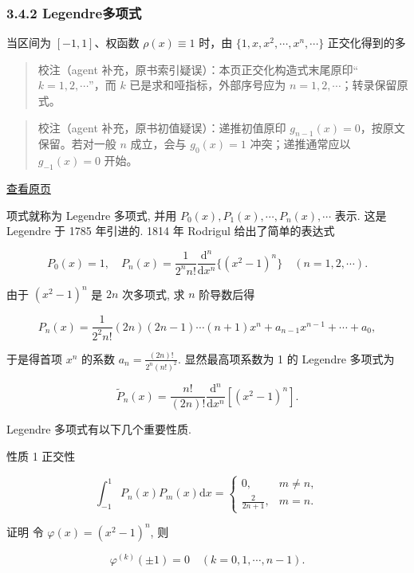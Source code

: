 \documentclass[
  10pt,
  fontset=fandol]{ctexart}
\begin{document}
\subsubsection{3.4.2 Legendre多项式}\label{legendreux591aux9879ux5f0f}

当区间为 \([-1, 1]\)、权函数 \(\rho(x) \equiv 1\) 时，由 \(\{1,\allowbreak  x,\allowbreak  x^2,\allowbreak  \cdots,\allowbreak  x^n,\allowbreak  \cdots\}\) 正交化得到的多

\begin{quote}
校注（agent 补充，原书索引疑误）：本页正交化构造式末尾原印``\(k=1,2,\cdots\)''，而 \(k\) 已是求和哑指标，外部序号应为 \(n=1,2,\cdots\)；转录保留原式。
\end{quote}

\begin{quote}
校注（agent 补充，原书初值疑误）：递推初值原印 \(g_{n-1}(x)=0\)，按原文保留。若对一般 \(n\) 成立，会与 \(g_0(x)=1\) 冲突；递推通常应以 \(g_{-1}(x)=0\) 开始。
\end{quote}

\href{../../source-images/pdf-071.jpeg}{查看原页}

项式就称为 Legendre 多项式, 并用 \(P_0(x), P_1(x), \cdots, P_n(x), \cdots\) 表示. 这是 Legendre 于 1785 年引进的. 1814 年 Rodrigul 给出了简单的表达式

\[
P_0(x) = 1, \quad P_n(x) = \frac{1}{2^n n!} \frac{\mathrm{d}^n}{\mathrm{d}x^n} \{(x^2 - 1)^n\} \quad (n = 1, 2, \cdots). \tag{3.4.1}
\]

由于 \((x^2 - 1)^n\) 是 \(2n\) 次多项式, 求 \(n\) 阶导数后得

\[
P_n(x) = \frac{1}{2^2 n!} (2n)(2n - 1) \cdots (n + 1)x^n + a_{n-1}x^{n-1} + \cdots + a_0,
\]

于是得首项 \(x^n\) 的系数 \(a_n = \frac{(2n)!}{2^n (n!)^2}\). 显然最高项系数为 1 的 Legendre 多项式为

\[
\tilde{P}_n(x) = \frac{n!}{(2n)!} \frac{\mathrm{d}^n}{\mathrm{d}x^n} [(x^2 - 1)^n]. \tag{3.4.2}
\]

Legendre 多项式有以下几个重要性质.

性质 1 正交性

\[
\int_{-1}^{1} P_n(x) P_m(x) \mathrm{d}x = \begin{cases} 0, & m \neq n, \\ \frac{2}{2n + 1}, & m = n. \end{cases} \tag{3.4.3}
\]

证明 令 \(\varphi(x) = (x^2 - 1)^n\), 则

\[
\varphi^{(k)}(\pm 1) = 0 \quad (k = 0, 1, \cdots, n - 1).
\]
\end{document}

